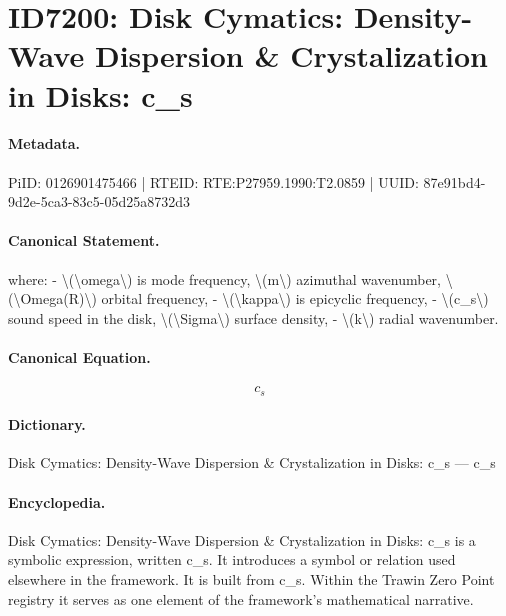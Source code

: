 \section*{ID7200: Disk Cymatics: Density-Wave Dispersion \& Crystalization in Disks: c\_s}
\paragraph{Metadata.}
PiID: 0126901475466 | RTEID: RTE:P27959.1990:T2.0859 | UUID: 87e91bd4-9d2e-5ca3-83c5-05d25a8732d3

\paragraph{Canonical Statement.}
where: - \textbackslash{}(\textbackslash{}omega\textbackslash{}) is mode frequency, \textbackslash{}(m\textbackslash{}) azimuthal wavenumber, \textbackslash{}(\textbackslash{}Omega(R)\textbackslash{}) orbital frequency, - \textbackslash{}(\textbackslash{}kappa\textbackslash{}) is epicyclic frequency, - \textbackslash{}(c\_s\textbackslash{}) sound speed in the disk, \textbackslash{}(\textbackslash{}Sigma\textbackslash{}) surface density, - \textbackslash{}(k\textbackslash{}) radial wavenumber.

\paragraph{Canonical Equation.}
\[
c_s
\]

\paragraph{Dictionary.}
Disk Cymatics: Density-Wave Dispersion \& Crystalization in Disks: c\_s — c\_s

\paragraph{Encyclopedia.}
Disk Cymatics: Density-Wave Dispersion \& Crystalization in Disks: c\_s is a symbolic expression, written c\_s. It introduces a symbol or relation used elsewhere in the framework. It is built from c\_s. Within the Trawin Zero Point registry it serves as one element of the framework's mathematical narrative.
